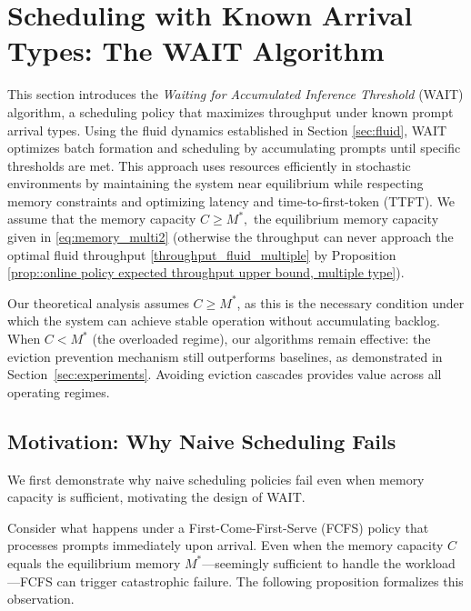 \section{Scheduling with Known Arrival Types: The WAIT Algorithm}
\label{sec:wait}

This section introduces the \textit{Waiting for Accumulated Inference Threshold} (WAIT) algorithm, a scheduling policy that maximizes throughput under known prompt arrival types. Using the fluid dynamics established in Section \ref{sec:fluid}, WAIT optimizes batch formation and scheduling by accumulating prompts until specific thresholds are met. This approach uses resources efficiently in stochastic environments by maintaining the system near equilibrium while respecting memory constraints and optimizing latency and time-to-first-token (TTFT). We assume that the memory capacity $C\ge M^*,$ the equilibrium memory capacity given in \eqref{eq:memory_multi2} (otherwise the throughput can never approach the optimal fluid throughput \eqref{throughput_fluid_multiple} by Proposition \ref{prop::online policy expected throughput upper bound, multiple type}).

\begin{remark}
\label{remark:memory_assumption}
Our theoretical analysis assumes $C \geq M^*$, as this is the necessary condition under which the system can achieve stable operation without accumulating backlog. When $C < M^*$ (the overloaded regime), our algorithms remain effective: the eviction prevention mechanism still outperforms baselines, as demonstrated in Section~\ref{sec:experiments}. Avoiding eviction cascades provides value across all operating regimes.
\end{remark}

\subsection{Motivation: Why Naive Scheduling Fails}
\label{subsec:wait_motivation}

We first demonstrate why naive scheduling policies fail even when memory capacity is sufficient, motivating the design of WAIT.

Consider what happens under a First-Come-First-Serve (FCFS) policy that processes prompts immediately upon arrival. Even when the memory capacity $C$ equals the equilibrium memory $M^*$---seemingly sufficient to handle the workload---FCFS can trigger catastrophic failure. The following proposition formalizes this observation.

